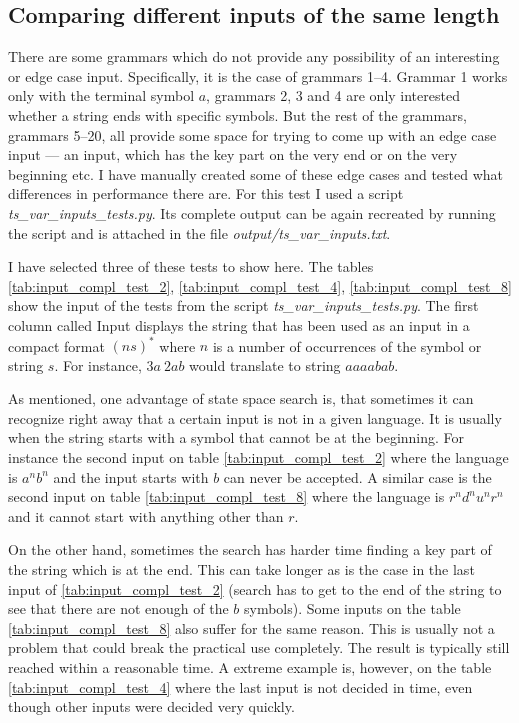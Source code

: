 \subsection{Comparing different inputs of the same length}
There are some grammars which do not provide any possibility of an interesting or edge case input. Specifically, it is the case of grammars 1--4. Grammar 1 works only with the terminal symbol $a$, grammars 2, 3 and 4 are only interested whether a string ends with specific symbols. But the rest of the grammars, grammars 5--20, all provide some space for trying to come up with an edge case input --- an input, which has the key part on the very end or on the very beginning etc. I have manually created some of these edge cases and tested what differences in performance there are. For this test I used a script \textit{ts\_var\_inputs\_tests.py}. Its complete output can be again recreated by running the script and is attached in the file \textit{output/ts\_var\_inputs.txt}.

I have selected three of these tests to show here. The tables \ref{tab:input_compl_test_2}, \ref{tab:input_compl_test_4}, \ref{tab:input_compl_test_8}  show the input of the tests from the script \textit{ts\_var\_inputs\_tests.py}. The first column called Input displays the string that has been used as an input in a compact format $(ns)^*$ where $n$ is a number of occurrences of the symbol or string $s$. For instance, $3a\:2ab$ would translate to string $aaaabab$.

As mentioned, one advantage of state space search is, that sometimes it can recognize right away that a certain input is not in a given language. It is usually when the string starts with a symbol that cannot be at the beginning. For instance the second input on table \ref{tab:input_compl_test_2} where the language is $a^nb^n$ and the input starts with $b$ can never be accepted. A similar case is the second input on table \ref{tab:input_compl_test_8} where the language is $r^nd^nu^nr^n$ and it cannot start with anything other than $r$.

On the other hand, sometimes the search has harder time finding a key part of the string which is at the end. This can take longer as is the case in the last input of \ref{tab:input_compl_test_2} (search has to get to the end of the string to see that there are not enough of the $b$ symbols). Some inputs on the table \ref{tab:input_compl_test_8} also suffer for the same reason. This is usually not a problem that could break the practical use completely. The result is typically still reached within a reasonable time. A extreme example is, however, on the table \ref{tab:input_compl_test_4} where the last input is not decided in time, even though other inputs were decided very quickly.

